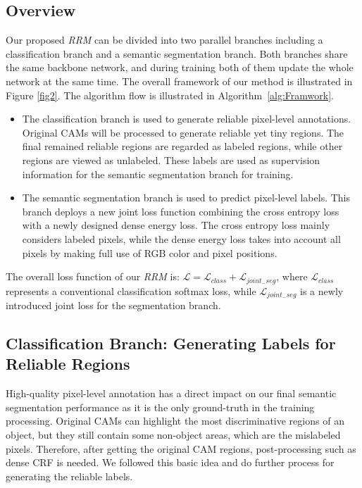 \documentclass[letterpaper]{article} \usepackage{aaai20}  \usepackage{times}  \usepackage{helvet} \usepackage{courier}  \usepackage[hyphens]{url}  \usepackage{graphicx} \urlstyle{rm} \def\UrlFont{\rm}  \usepackage{graphicx}  \frenchspacing  \setlength{\pdfpagewidth}{8.5in}  \setlength{\pdfpageheight}{11in}
\begin{document}
\subsection{Overview}
Our proposed \emph{RRM} can be divided into two parallel branches including a classification branch and a semantic segmentation branch. Both branches share the same backbone network, and during training both of them update the whole network at the same time. The overall framework of our method is illustrated in Figure \ref{fig2}. The  algorithm flow is illustrated in Algorithm~\ref{alg:Framwork}.
\begin{itemize}
	\item The classification branch is used to generate reliable pixel-level annotations. Original CAMs will be processed to generate reliable yet tiny regions. The final remained reliable regions are regarded as labeled regions, while other regions are viewed as unlabeled. These labels are used as supervision information for the semantic segmentation branch for training. 
	\item The semantic segmentation branch is used to predict pixel-level labels. This branch deploys a new joint loss function combining the cross entropy loss with a newly designed dense energy loss. The cross entropy loss mainly considers labeled pixels, while the dense energy loss takes into account all pixels by making full use of RGB color and pixel positions. 
\end{itemize}

The overall loss function of our \emph{RRM} is: $\mathcal{L}=\mathcal{L}_{class} + \mathcal{L}_{joint_{-}seg} \label{Loss}$, where $\mathcal{L}_{class}$ represents a conventional classification softmax loss, while $\mathcal{L}_{joint_{-}seg}$ is a newly introduced joint loss for the segmentation branch.  

\subsection{Classification Branch: Generating Labels for Reliable Regions}\label{sec3.2}

High-quality pixel-level annotation has a direct impact on our final semantic segmentation performance as it is the only ground-truth in the training processing. Original CAMs can highlight the most discriminative regions of an object, but they still contain some non-object areas, which are the mislabeled pixels. Therefore, after getting the original CAM regions, post-processing such as dense CRF \cite{krahenbuhl2013parameter} is needed. We followed this basic idea and do further process for generating the reliable labels.
\end{document}
